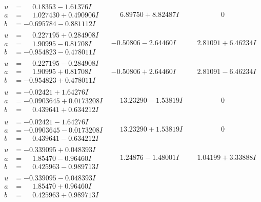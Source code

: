 \documentclass[1p]{elsarticle_modified}
\theoremstyle{definition}
\begin{document}
$$\begin{array}{c|c|c}
\begin{aligned}
u &= \phantom{-}0.18353 - 1.61376 I \\
a &= \phantom{-}1.027430 + 0.490906 I \\
b &= -0.695784 - 0.881112 I\end{aligned}
 & \phantom{-}6.89750 + 8.82487 I & \phantom{-0.000000 } 0 \\ \hline\begin{aligned}
u &= \phantom{-}0.227195 + 0.284908 I \\
a &= \phantom{-}1.90995 - 0.81708 I \\
b &= -0.954823 - 0.478011 I\end{aligned}
 & -0.50806 - 2.64460 I & \phantom{-}2.81091 + 6.46234 I \\ \hline\begin{aligned}
u &= \phantom{-}0.227195 - 0.284908 I \\
a &= \phantom{-}1.90995 + 0.81708 I \\
b &= -0.954823 + 0.478011 I\end{aligned}
 & -0.50806 + 2.64460 I & \phantom{-}2.81091 - 6.46234 I \\ \hline\begin{aligned}
u &= -0.02421 + 1.64276 I \\
a &= -0.0903645 + 0.0173208 I \\
b &= \phantom{-}0.439641 + 0.634212 I\end{aligned}
 & \phantom{-}13.23290 - 1.53819 I & \phantom{-0.000000 } 0 \\ \hline\begin{aligned}
u &= -0.02421 - 1.64276 I \\
a &= -0.0903645 - 0.0173208 I \\
b &= \phantom{-}0.439641 - 0.634212 I\end{aligned}
 & \phantom{-}13.23290 + 1.53819 I & \phantom{-0.000000 } 0 \\ \hline\begin{aligned}
u &= -0.339095 + 0.048393 I \\
a &= \phantom{-}1.85470 - 0.96460 I \\
b &= \phantom{-}0.425963 - 0.989713 I\end{aligned}
 & \phantom{-}1.24876 - 1.48001 I & \phantom{-}1.04199 + 3.33888 I \\ \hline\begin{aligned}
u &= -0.339095 - 0.048393 I \\
a &= \phantom{-}1.85470 + 0.96460 I \\
b &= \phantom{-}0.425963 + 0.989713 I\end{aligned}

\end{array}$$
\end{document}
